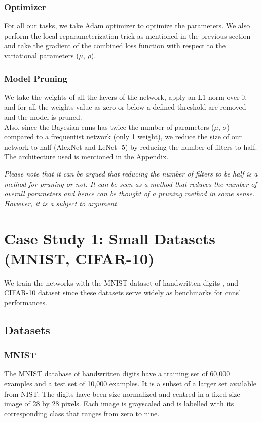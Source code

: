 \subsubsection{Optimizer}

For all our tasks, we take Adam optimizer \cite{kingma2014adam} to optimize the parameters. We also perform the local reparameterization trick as mentioned in the previous section and take the gradient of the combined loss function with respect to the variational parameters ($\mu$, $\rho$).

\subsubsection{Model Pruning}

We take the weights of all the layers of the network, apply an L1 norm over it and for all the weights value as zero or below a defined threshold are removed and the model is pruned. \\ Also, since the Bayesian \acp{cnn} has twice the number of parameters ($\mu$, $\sigma$) compared to a frequentist network (only 1 weight), we reduce the size of our network to half (AlexNet and LeNet- 5) by reducing the number of filters to half. The architecture used is mentioned in the Appendix.

\textit{Please note that it can be argued that reducing the number of filters to be half is a method for pruning or not. It can be seen as a method that reduces the number of overall parameters and hence can be thought of a pruning method in some sense. However, it is a subject to argument.} 

\section{Case Study 1: Small Datasets (MNIST, CIFAR-10)}

We train the networks with the MNIST dataset of handwritten digits \cite{lecun1998gradient}, and CIFAR-10 dataset \cite{krizhevsky2009learning} since these datasets serve widely as benchmarks for \acp{cnn}' performances. 

\subsection{Datasets}
\newline
\subsubsection{MNIST}
The MNIST database \cite{lecun-mnisthandwrittendigit-2010} of handwritten digits have a training set of 60,000 examples and a test set of 10,000 examples. It is a subset of a larger set available from NIST. The digits have been size-normalized and centred in a fixed-size image of 28 by 28 pixels. Each image is grayscaled and is labelled with its corresponding class that ranges from zero to nine.
\newline

